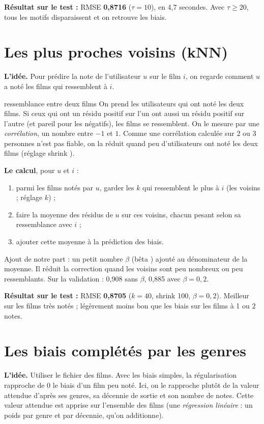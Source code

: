 \documentclass[11pt,a4paper]{article}
\newcommand{\resultat}[1]{\par\textbf{Résultat sur le test :} #1\par}
\begin{document}
\resultat{RMSE \textbf{0,8716} ($\tau = 10$), en 4,7 secondes. Avec $\tau \geq 20$, tous
les motifs disparaissent et on retrouve les biais.}

\section{Les plus proches voisins (kNN)}

\textbf{L'idée.} Pour prédire la note de l'utilisateur $u$ sur le film $i$, on regarde
comment $u$ a noté les films qui \og ressemblent \fg{} à $i$.

\begin{definition}{ressemblance entre deux films}
On prend les utilisateurs qui ont noté les deux films. Si ceux qui ont un résidu positif
sur l'un ont aussi un résidu positif sur l'autre (et pareil pour les négatifs), les films
se ressemblent. On le mesure par une \emph{corrélation}, un nombre entre $-1$ et $1$.
Comme une corrélation calculée sur 2 ou 3 personnes n'est pas fiable, on la réduit quand
peu d'utilisateurs ont noté les deux films (réglage \og shrink \fg).
\end{definition}

\textbf{Le calcul}, pour $u$ et $i$ :
\begin{enumerate}
  \item parmi les films notés par $u$, garder les $k$ qui ressemblent le plus à $i$
        (les \og voisins \fg ; réglage $k$) ;
  \item faire la moyenne des résidus de $u$ sur ces voisins, chacun pesant selon sa
        ressemblance avec $i$ ;
  \item ajouter cette moyenne à la prédiction des biais.
\end{enumerate}
Ajout de notre part : un petit nombre $\beta$ (\og bêta \fg) ajouté au dénominateur de la
moyenne. Il réduit la correction quand les voisins sont peu nombreux ou peu ressemblants.
Sur la validation : 0,908 sans $\beta$, 0,885 avec $\beta = 0{,}2$.

\resultat{RMSE \textbf{0,8705} ($k = 40$, shrink 100, $\beta = 0{,}2$). Meilleur sur les
films très notés ; légèrement moins bon que les biais sur les films à 1 ou 2 notes.}

\section{Les biais complétés par les genres}

\textbf{L'idée.} Utiliser le fichier des films. Avec les biais simples, la régularisation
rapproche de 0 le biais d'un film peu noté. Ici, on le rapproche plutôt de la valeur
attendue d'après ses genres, sa décennie de sortie et son nombre de notes. Cette valeur
attendue est apprise sur l'ensemble des films (une \emph{régression linéaire} : un poids
par genre et par décennie, qu'on additionne).
\end{document}
